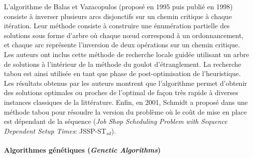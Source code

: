 L'algorithme de Balas et Vazacopulos (proposé en 1995 puis publié en 1998) consiste à inverser plusieurs arcs disjonctifs sur un chemin critique à chaque itération. Leur méthode consiste à construire une énumération partielle des solutions sous forme d'arbre où chaque nœud correspond à un ordonnancement, et chaque arc représente l'inversion de deux opérations sur un chemin critique. Les auteurs ont inclus cette méthode de recherche locale guidée utilisant un arbre de solutions à l'intérieur de la méthode du goulot d'étranglement. La recherche tabou est ainsi utilisée en tant que phase de post-optimisation de l'heuristique. Les résultats obtenus par les auteurs montrent que l'algorithme permet d'obtenir des solutions optimales ou proches de l'optimal de façon très rapide à diverses instances classiques de la littérature.
Enfin, en 2001, Schmidt a proposé dans \cite{Schmidt2001} une méthode tabou pour résoudre la version du problème où le coût de mise en place est dépendant de la séquence (\textit{Job Shop Scheduling Problem with Sequence Dependent Setup Times}: JSSP-ST$_{sd}$).

\paragraph{Algorithmes génétiques (\textit{Genetic Algorithms})}

